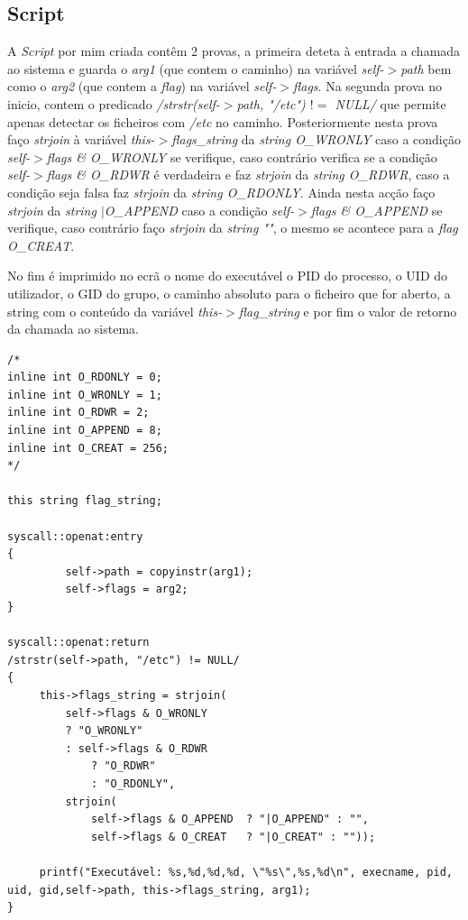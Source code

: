 \documentclass[conference,compsoc]{IEEEtran}
\begin{document}
\subsection{Script}
A \textit{Script} por mim criada contêm 2 provas, a primeira deteta à entrada a chamada ao sistema e guarda o \textit{arg1} (que contem o caminho) na variável \textit{self-$>$path} bem como o \textit{arg2} (que contem a \textit{flag}) na variável \textit{self-$>$flags}. Na segunda prova no inicio, contem o predicado \textit{/strstr(self-$>$path, "/etc") $!=$ NULL/} que permite apenas detectar os ficheiros com \textit{/etc} no caminho. Posteriormente nesta prova faço \textit{strjoin} à variável \textit{this-$>$flags\_string} da \textit{string O\_WRONLY} caso a condição \textit{self-$>$flags \& O\_WRONLY} se verifique, caso contrário verifica se a condição \textit{self-$>$flags \& O\_RDWR} é verdadeira e faz \textit{strjoin} da \textit{string O\_RDWR}, caso a condição seja falsa faz \textit{strjoin} da \textit{string O\_RDONLY}. Ainda nesta acção faço \textit{strjoin} da \textit{string $|$O\_APPEND} caso a condição \textit{self-$>$flags \& O\_APPEND} se verifique, caso contrário faço \textit{strjoin} da \textit{string ""}, o mesmo se acontece para a \textit{flag O\_CREAT}.

No fim é imprimido no ecrã o nome do executável o PID do processo, o UID do utilizador, o GID do grupo, o caminho absoluto para o ficheiro que for aberto, a string com o conteúdo da variável \textit{this-$>$flag\_string} e por fim o valor de retorno da chamada ao sistema.

\begin{lstlisting}
/*
inline int O_RDONLY = 0;
inline int O_WRONLY = 1;
inline int O_RDWR = 2;
inline int O_APPEND = 8;
inline int O_CREAT = 256;
*/

this string flag_string;

syscall::openat:entry
{
         self->path = copyinstr(arg1);
         self->flags = arg2;
}

syscall::openat:return 
/strstr(self->path, "/etc") != NULL/
{
     this->flags_string = strjoin(
         self->flags & O_WRONLY
         ? "O_WRONLY"
         : self->flags & O_RDWR
             ? "O_RDWR"
             : "O_RDONLY",
         strjoin(
             self->flags & O_APPEND  ? "|O_APPEND" : "",
             self->flags & O_CREAT   ? "|O_CREAT" : ""));
 
     printf("Executável: %s,%d,%d,%d, \"%s\",%s,%d\n", execname, pid, uid, gid,self->path, this->flags_string, arg1);
}
\end{lstlisting}
\end{document}

